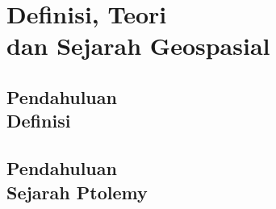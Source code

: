 \documentclass{WileySix}
\begin{document}
\tableofcontents
\listoffigures %
\listoftables  %














\part[Pendahuluan]
{Definisi, Teori\\ dan Sejarah Geospasial}

\chapter[Definisi]
{Pendahuluan\\ Definisi}


\chapter[Sejarah Ptolemy]
{Pendahuluan\\ Sejarah Ptolemy}

\end{document}

